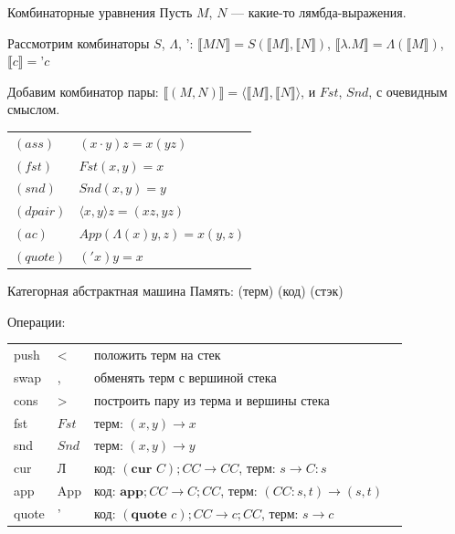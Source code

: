 \documentclass[aspectratio=169,dvipsnames,usenames]{beamer}
\begin{document}
\begin{frame}{Комбинаторные уравнения}
Пусть $M$, $N$ --- какие-то лямбда-выражения.

Рассмотрим комбинаторы $S$, $\Lambda$, $\text{'}$:
$\llbracket M N \rrbracket = S(\llbracket M \rrbracket, \llbracket N \rrbracket)$, $\llbracket \lambda . M\rrbracket = \Lambda (\llbracket M \rrbracket)$,
$\llbracket c \rrbracket = \text{'}c$\vspace{0.5cm}

Добавим комбинатор пары: $\llbracket (M, N) \rrbracket = \langle \llbracket M \rrbracket, \llbracket N \rrbracket \rangle$,
и $Fst$, $Snd$, с очевидным смыслом.


\begin{tabular}{ll}
$(ass)$ & $(x \cdot y) z = x(yz)$\\
$(fst)$ & $Fst(x,y) = x$\\
$(snd)$ & $Snd(x,y) = y$\\
$(dpair)$ & $\langle x, y \rangle z = (xz, yz)$\\
$(ac)$ &  $App(\Lambda(x)y,z) = x (y,z)$\\
$(quote)$ & $('x)y = x$
\end{tabular}
\end{frame}

\begin{frame}{Категорная абстрактная машина}
Память: (терм) (код) (стэк)

Операции:


\begin{tabular}{llll}
push & < & положить терм на стек \\
swap & , & обменять терм с вершиной стека\\
cons & > & построить пару из терма и вершины стека\\
fst & $Fst$ & терм: $(x,y) \rightarrow x$\\
snd & $Snd$ & терм: $(x,y) \rightarrow y$\\
cur & Л & код: $(\textbf{cur } C);CC \rightarrow CC$, терм: $s \rightarrow C:s$\\
app & App & код: $\textbf{app};CC \rightarrow C;CC$, терм: $(CC:s,t) \rightarrow (s,t)$\\
quote & ' & код: $(\textbf{quote }c);CC \rightarrow c;CC$, терм: $s \rightarrow c$ 
\end{tabular}
\end{frame}
\end{document}
